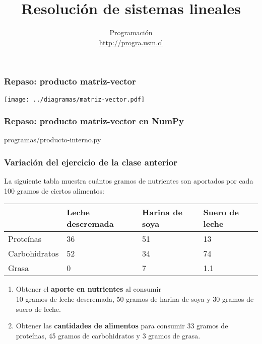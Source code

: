 \documentclass[12pt]{beamer}
\title{Resolución de sistemas lineales}
\author{
  Programación \\ \url{http://progra.usm.cl}
}
\date{}
\begin{document}
  \begin{frame}
    \maketitle
  \end{frame}

  \begin{frame}
    \label{producto-matriz-vector}
    \frametitle{Repaso: producto matriz-vector}
    \texttt{[image: ../diagramas/matriz-vector.pdf]}
  \end{frame}

  \begin{frame}
    \label{producto-matriz-vector-numpy}
    \frametitle{Repaso: producto matriz-vector en NumPy}
    
        {programas/producto-interno.py}
  \end{frame}

  \begin{frame}
    \label{ejercicio-nutrientes}
    \frametitle{Variación del ejercicio de la clase anterior}
    La siguiente tabla muestra cuántos gramos de nutrientes
    son aportados por cada 100 gramos de ciertos alimentos:
    \vspace{2ex}

    {\footnotesize
    \begin{tabular}{lp{6em}p{6em}p{4.5em}}
      & \raggedright Leche descremada & \raggedright Harina de soya & {\raggedright Suero de leche} \\\hline
      Proteínas     &  36 &   51 &   13  \\\hline
      Carbohidratos &  52 &   34 &   74  \\\hline
      Grasa         &   0 &    7 &  1.1  \\\hline
    \end{tabular}}

    \begin{enumerate}
      \vspace{2ex}
      \item
        Obtener el \textbf{aporte en nutrientes} al consumir \\
        10 gramos de leche descremada,
        50 gramos de harina de soya y
        30 gramos de suero de leche.
      \vspace{2ex}
      \item
        Obtener las \textbf{cantidades de alimentos} para consumir
        33 gramos de proteínas,
        45 gramos de carbohidratos y
        3 gramos de grasa.
    \end{enumerate}
  \end{frame}
\end{document}
